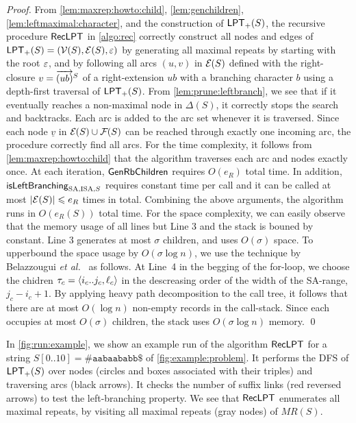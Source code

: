 \begin{proof}
From
\cref{lem:maxrep:howto:child},
\cref{lem:genchildren},
\cref{lem:leftmaximal:character},
and the construction of $\mathsf{LPT}_{+}(S)$, 
the recursive procedure $\textsf{RecLPT}$ in \cref{algo:rec} correctly construct all nodes and edges of $\mathsf{LPT}_{+}(S) = (\mathcal{V}(S), \mathcal{E}(S), \varepsilon)$ by generating all maximal repeats by starting with the root $\varepsilon$, and by following all arcs $(u, v)$ in $\mathcal{E}_{}(S)$ defined with the right-closure $v = \overrightarrow{(ub)}^{S}$ of a right-extension $ub$ with a branching character $b$ using a depth-first traversal of $\mathsf{LPT}_{+}(S)$.
From \cref{lem:prune:leftbranch}, we see that if it eventually reaches a non-maximal node in $\Delta(S)$, it correctly stops the search and backtracks. Each arc is added to the arc set whenever it is traversed. Since each node $\underline v$ in $\mathcal{E}_{}(S)\cup \mathcal{F}_{}(S)$ can be reached through exactly one incoming arc, the procedure correctly find all arcs.
For the time complexity, it follows from \cref{lem:maxrep:howto:child} that the algorithm traverses each arc and nodes exactly once. At each iteration, $\textsf{GenRbChildren}_{}$ requires $O(e_R)$ total time. In addition, $\mbox{\textsf{isLeftBranching}}_{{\mathrm{SA}, \mathrm{ISA}, S}}$ requires constant time per call and it can be called at most $|\mathcal{E}(S)| \leqslant e_R$ times in total. Combining the above arguments, the algorithm runs in $O(e_R(S))$ total time.
For the space complexity, we can easily observe that the memory usage of all lines but Line 3 and the stack is bouned by constant. Line 3 generates at most $\sigma$ children, and uses $O(\sigma)$ space. 
To upperbound the space usage by $O(\sigma\log n)$, we use the technique by Belazzougui \textit{et al.}~\cite{belazzougui2020linear} as follows. At Line~4 in the begging of the for-loop, we choose the chidren $\tau_c = \langle i_c..j_c, \ell_c\rangle$ in the descreasing order of the width of the SA-range, $j_c - i_c + 1$. By applying heavy path decomposition to the call tree, it follows that there are at most $O(\log n)$ non-empty records in the call-stack. Since each occupies at most $O(\sigma)$ children, the stack uses $O(\sigma \log n)$ memory. 
\qed\end{proof}

In \cref{fig:run:example}, we show an example run of the algorithm $\textsf{RecLPT}$ for a string $S[0..10] = \mathtt{\#aabaababb\$}$ of \cref{fig:example:problem}. It performs the DFS of $\mathsf{LPT}_{+}(S)$ over nodes (circles and boxes associated with their triples) and traversing arcs (black arrows). It checks the number of suffix links (red reversed arrows) to test the left-branching property.  We see that $\textsf{RecLPT}$ enumerates all maximal repeats, by visiting all maximal repeats (gray nodes) of $MR(S)$. 

